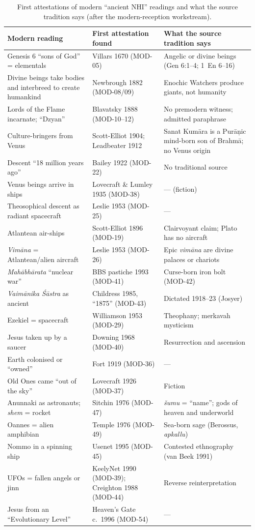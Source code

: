 \documentclass[11pt,a4paper]{article}
\begin{document}
\begin{table}[p]
\centering\footnotesize
\caption{First attestations of modern ``ancient NHI'' readings and what the source tradition says (after the modern-reception workstream).}\label{tab:firsts}
\begin{tabularx}{\textwidth}{@{}p{4.4cm}p{3.2cm}X@{}}
\toprule
Modern reading & First attestation found & What the source tradition says \\
\midrule
Genesis 6 ``sons of God'' = elementals & Villars 1670 (MOD-05) & Angelic or divine beings (Gen 6:1--4; 1~En 6--16) \\
Divine beings take bodies and interbreed to create humankind & Newbrough 1882 (MOD-08/09) & Enochic Watchers produce giants, not humanity \\
Lords of the Flame incarnate; ``Dzyan'' & Blavatsky 1888 (MOD-10--12) & No premodern witness; admitted paraphrase \\
Culture-bringers from Venus & Scott-Elliot 1904; Leadbeater 1912 & Sanat Kumāra is a Purāṇic mind-born son of Brahmā; no Venus origin \\
Descent ``18 million years ago'' & Bailey 1922 (MOD-22) & No traditional source \\
Venus beings arrive in ships & Lovecraft \& Lumley 1935 (MOD-38) & --- (fiction) \\
Theosophical descent as radiant spacecraft & Leslie 1953 (MOD-25) & --- \\
Atlantean air-ships & Scott-Elliot 1896 (MOD-19) & Clairvoyant claim; Plato has no aircraft \\
\emph{Vimāna} = Atlantean/alien aircraft & Leslie 1953 (MOD-26) & Epic \emph{vimāna} are divine palaces or chariots \\
\emph{Mahābhārata} ``nuclear war'' & BBS pastiche 1993 (MOD-41) & Curse-born iron bolt (MOD-42) \\
\emph{Vaimānika Śāstra} as ancient & Childress 1985, ``1875'' (MOD-43) & Dictated 1918--23 (Josyer) \\
Ezekiel = spacecraft & Williamson 1953 (MOD-29) & Theophany; merkavah mysticism \\
Jesus taken up by a saucer & Downing 1968 (MOD-40) & Resurrection and ascension \\
Earth colonised or ``owned'' & Fort 1919 (MOD-36) & --- \\
Old Ones came ``out of the sky'' & Lovecraft 1926 (MOD-37) & Fiction \\
Anunnaki as astronauts; \emph{shem} = rocket & Sitchin 1976 (MOD-47) & \emph{šumu} = ``name''; gods of heaven and underworld \\
Oannes = alien amphibian & Temple 1976 (MOD-49) & Sea-born sage (Berossus, \emph{apkallu}) \\
Nommo in a spinning ship & Usenet 1995 (MOD-45) & Contested ethnography (van Beek 1991) \\
UFOs = fallen angels or jinn & KeelyNet 1990 (MOD-39); Creighton 1988 (MOD-44) & Reverse reinterpretation \\
Jesus from an ``Evolutionary Level'' & Heaven's Gate c.~1996 (MOD-54) & --- \\
\bottomrule
\end{tabularx}
\end{table}
\end{document}
